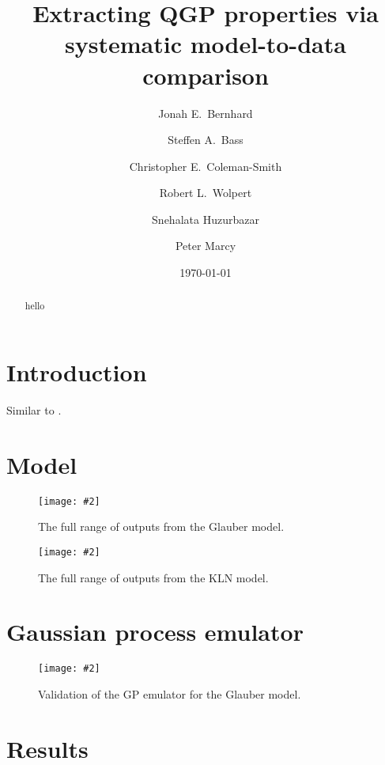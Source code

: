 \documentclass[aps, prc, reprint, amsmath]{revtex4-1}
\newcommand{\widefig}[3][t]{
  \begin{figure*}[#1]
    \texttt{[image: \#2]}
    \caption{\label{fig:#2}#3}
  \end{figure*}
}
\begin{document}
\title{Extracting QGP properties via systematic model-to-data comparison}

\author{Jonah E.\ Bernhard}
\author{Steffen A.\ Bass}
\author{Christopher E.\ Coleman-Smith}
\author{Robert L.\ Wolpert}

\author{Snehalata Huzurbazar}

\author{Peter Marcy}


\date{\today}

\begin{abstract}
  hello
\end{abstract}

\maketitle


\section{Introduction}

Similar to \cite{pratt-mtd, soltz-mtd}.


\section{Model}

\cite{bass-dumitru, nonaka-bass, song}
\cite{glauber}
\cite{kln}
\cite{vish}
\cite{cooper-frye}
\cite{iss}
\cite{urqmd1, urqmd2}
\cite{iebe}

\widefig{prior_draws_glb}{
  The full range of outputs from the Glauber model.
}

\widefig{prior_draws_kln}{
  The full range of outputs from the KLN model.
}


\section{Gaussian process emulator}

\cite{gpml}
\cite{ohagan, higdon2008, higdon2014}

\widefig{validation_glb}{
  Validation of the GP emulator for the Glauber model.
}


\section{Results}

\cite{alice-cumulants}
\cite{osu1, osu2}
\end{document}
